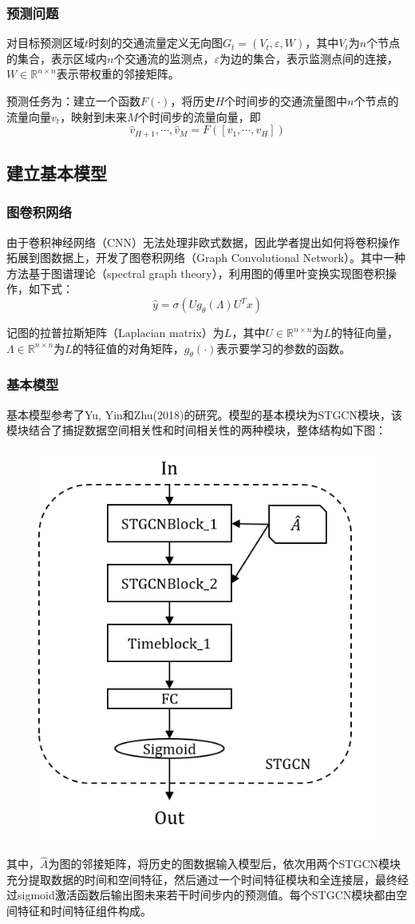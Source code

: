 \documentclass[UTF8]{ctexart}
\numberwithin{equation}{section}
\begin{document}
\subsubsection{预测问题}
对目标预测区域$t$时刻的交通流量定义无向图$G_t=(V_t,\varepsilon,W)$，其中$V_t$为$n$个节点的集合，表示区域内$n$个交通流的监测点，$\varepsilon$为边的集合，表示监测点间的连接，$W\in \mathbb{R}^{n\times n}$表示带权重的邻接矩阵。

预测任务为：建立一个函数$F(\cdot)$，将历史$H$个时间步的交通流量图中$n$个节点的流量向量$v_t$，映射到未来$M$个时间步的流量向量，即
$$
\hat v_{H+1},\dotsm, \hat v_{M}=F([v_1,\dotsm,v_H])
$$

\subsection{建立基本模型}
\subsubsection{图卷积网络}
由于卷积神经网络（CNN）无法处理非欧式数据，因此学者提出如何将卷积操作拓展到图数据上，开发了图卷积网络（Graph Convolutional Network）。其中一种方法基于图谱理论（spectral graph theory），利用图的傅里叶变换实现图卷积操作\cite{bib:two}，如下式：
\begin{equation}\label{eq:a}
	\hat y = \sigma(Ug_{\theta}(\Lambda)U^Tx)
\end{equation}

记图的拉普拉斯矩阵（Laplacian matrix）为$L$，其中$U\in \mathbb{R}^{n\times n}$为$L$的特征向量，$\Lambda \in \mathbb{R}^{n\times n}$为$L$的特征值的对角矩阵，$g_{\theta}(\cdot)$表示要学习的参数的函数。

\subsubsection{基本模型}
基本模型参考了Yu, Yin和Zhu(2018)的研究\cite{bib:three}。模型的基本模块为STGCN模块，该模块结合了捕捉数据空间相关性和时间相关性的两种模块，整体结构如下图：
\begin{figure}[H]
	\centering
	\includegraphics[width=.4\textwidth]{model1.png}
\end{figure}
其中，$\hat A$为图的邻接矩阵，将历史的图数据输入模型后，依次用两个STGCN模块充分提取数据的时间和空间特征，然后通过一个时间特征模块和全连接层，最终经过sigmoid激活函数后输出图未来若干时间步内的预测值。每个STGCN模块都由空间特征和时间特征组件构成。
\end{document}
